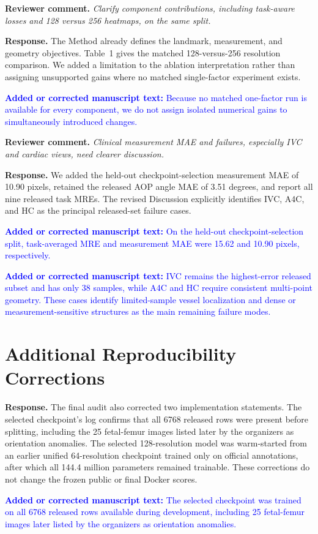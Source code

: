 \documentclass[11pt]{article}
\newcommand{\reviewcomment}[1]{\par\noindent\textbf{Reviewer comment.} \emph{#1}\par}
\newcommand{\response}[1]{\par\noindent\textbf{Response.} #1\par}
\newcommand{\manuscriptchange}[1]{\par\smallskip\noindent\textcolor{blue}{\textbf{Added or corrected manuscript text:} #1}\par\smallskip}
\begin{document}
\reviewcomment{Clarify component contributions, including task-aware losses and 128 versus 256 heatmaps, on the same split.}
\response{The Method already defines the landmark, measurement, and geometry objectives. Table~1 gives the matched 128-versus-256 resolution comparison. We added a limitation to the ablation interpretation rather than assigning unsupported gains where no matched single-factor experiment exists.}

\manuscriptchange{Because no matched one-factor run is available for every component, we do not assign isolated numerical gains to simultaneously introduced changes.}

\reviewcomment{Clinical measurement MAE and failures, especially IVC and cardiac views, need clearer discussion.}
\response{We added the held-out checkpoint-selection measurement MAE of 10.90 pixels, retained the released AOP angle MAE of 3.51 degrees, and report all nine released task MREs. The revised Discussion explicitly identifies IVC, A4C, and HC as the principal released-set failure cases.}

\manuscriptchange{On the held-out checkpoint-selection split, task-averaged MRE and measurement MAE were 15.62 and 10.90 pixels, respectively.}

\manuscriptchange{IVC remains the highest-error released subset and has only 38 samples, while A4C and HC require consistent multi-point geometry. These cases identify limited-sample vessel localization and dense or measurement-sensitive structures as the main remaining failure modes.}

\section*{Additional Reproducibility Corrections}

\response{The final audit also corrected two implementation statements. The selected checkpoint's log confirms that all 6768 released rows were present before splitting, including the 25 fetal-femur images listed later by the organizers as orientation anomalies. The selected 128-resolution model was warm-started from an earlier unified 64-resolution checkpoint trained only on official annotations, after which all 144.4 million parameters remained trainable. These corrections do not change the frozen public or final Docker scores.}

\manuscriptchange{The selected checkpoint was trained on all 6768 released rows available during development, including 25 fetal-femur images later listed by the organizers as orientation anomalies.}
\end{document}
